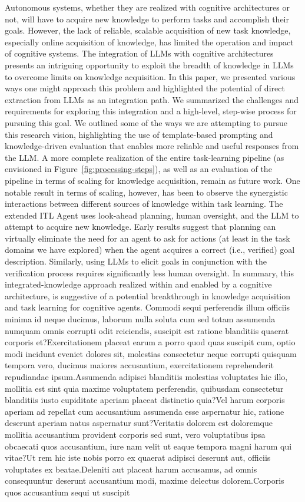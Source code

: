 \documentclass[letterpaper]{article} %
\begin{document}
Autonomous systems, whether they are realized with cognitive architectures or not, will have to acquire new knowledge to perform tasks and accomplish their goals.
However, the lack of reliable, scalable acquisition of new task knowledge, especially online acquisition of knowledge, has limited the operation and impact of cognitive systems. The integration of LLMs with cognitive architectures presents an intriguing opportunity to exploit the breadth of knowledge in LLMs to overcome limits on knowledge acquisition.  In this paper, we presented various ways one might approach this problem and highlighted the potential of direct extraction from LLMs as an integration path. We summarized the challenges and requirements for exploring this integration and a high-level, step-wise process for pursuing this goal. We outlined some of the ways we are attempting to pursue this research vision, highlighting the use of template-based prompting and knowledge-driven evaluation that enables more reliable and useful responses from the LLM.  A more complete realization of the entire task-learning pipeline (as envisioned in Figure~\ref{fig:processing-steps}), as well as an evaluation of the pipeline in terms of scaling for knowledge acquisition, remain as future work. One notable result in terms of scaling, however, has been to observe the synergistic interactions between different sources of knowledge within task learning. The extended ITL Agent uses look-ahead planning, human oversight, and the LLM to attempt to acquire new knowledge. Early results \cite{kirk_integrating_2023} suggest that planning can virtually eliminate the need for an agent to ask for actions (at least in the task domains we have explored) when the agent acquires a correct (i.e., verified) goal description. Similarly, using LLMs to elicit goals in conjunction with the verification process requires significantly less human oversight. In summary, this integrated-knowledge approach realized within and enabled by a cognitive architecture, is suggestive of a potential breakthrough in knowledge acquisition and task learning for cognitive agents.  Commodi sequi perferendis illum officiis minima id neque ducimus, laborum nulla soluta cum sed totam assumenda numquam omnis corrupti odit reiciendis, suscipit est ratione blanditiis quaerat corporis et?Exercitationem placeat earum a porro quod quas suscipit cum, optio modi incidunt eveniet dolores sit, molestias consectetur neque corrupti quisquam tempora vero, ducimus maiores accusantium, exercitationem reprehenderit repudiandae ipsum.Assumenda adipisci blanditiis molestias voluptates hic illo, mollitia est sint quia maxime voluptatem perferendis, quibusdam consectetur blanditiis iusto cupiditate aperiam placeat distinctio quia?Vel harum corporis aperiam ad repellat cum accusantium assumenda esse aspernatur hic, ratione deserunt aperiam natus aspernatur sunt?Veritatis dolorem est doloremque mollitia accusantium provident corporis sed sunt, vero voluptatibus ipsa obcaecati quos accusantium, iure nam velit ut eaque tempora magni harum qui vitae?Ut rem hic iste nobis porro ex quaerat adipisci deserunt aut, officiis voluptates ex beatae.Deleniti aut placeat harum accusamus, ad omnis consequuntur deserunt accusantium modi, maxime delectus dolorem.Corporis quos accusantium sequi ut suscipit 
\end{document}
